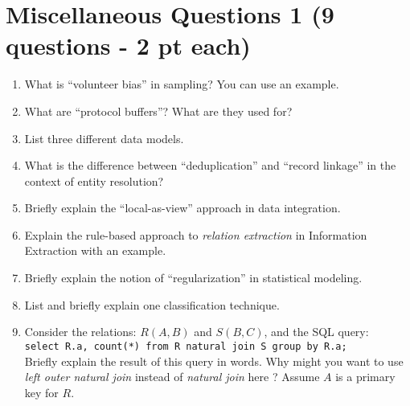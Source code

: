 \documentclass[11pt]{article}
\newcommand{\answer}[2]{\noindent {\bf Answer:} #2}
\renewcommand{\answer}[2]{\vspace{#1}}
\begin{document}
\section*{Miscellaneous Questions 1 (9 questions - 2 pt each)}
\begin{enumerate}

\item What is ``volunteer bias'' in sampling? You can use an example.

\answer{1.7in}{See class notes.}

\item What are ``protocol buffers''? What are they used for?

\answer{1.7in}{See class notes.}

\item List three different data models.

\answer{1.7in}{See class notes.}

\item What is the difference between ``deduplication'' and ``record linkage'' in the context of entity resolution?

\answer{2.1in}{See class notes.}

\item Briefly explain the ``local-as-view'' approach in data integration.

\answer{2.1in}{See class notes.}

\item Explain the rule-based approach to {\em relation extraction} in Information Extraction with an
example.

\answer{2.1in}{See class notes.}

\item Briefly explain the notion of ``regularization'' in statistical modeling.

\answer{2.1in}{See class notes.}

\item List and briefly explain one classification technique.

\answer{2in}{See class notes.}

\item Consider the relations: $R(A, B)$ and $S(B, C)$, and the SQL query: \\[3pt] {\tt select R.a, count(*) from R natural join S group by R.a;} \\[2pt]
Briefly explain the result of this query in words. Why might you want to use {\em left outer natural join} instead of {\em natural join} here ? 
Assume $A$ is a primary key for $R$.

\answer{2.5in}{The query returns for each tuple in $R$, the number of matching tuples in $S$. The result will not contain any tuples $t = (a, b)$ in $R$ that do not have a match in $S$, and we might want to use outerjoin to produce the result $(a, b, 0)$ for those tuples.}




\end{enumerate}
\end{document}
